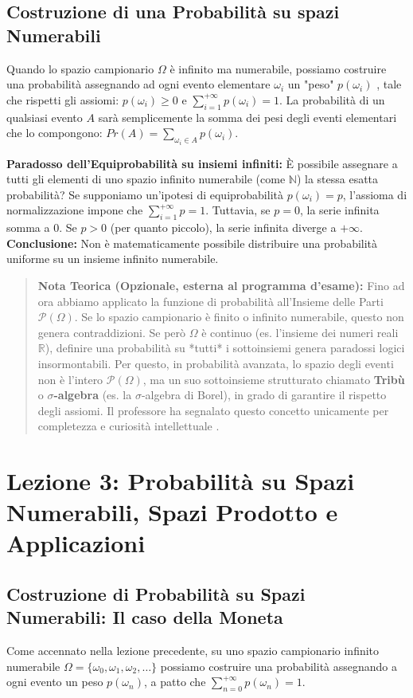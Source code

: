 \documentclass[12pt, a4paper]{article}
\begin{document}
\subsection{Costruzione di una Probabilità su spazi Numerabili}
Quando lo spazio campionario $\Omega$ è infinito ma numerabile, possiamo costruire una probabilità assegnando ad ogni evento elementare $\omega_i$ un "peso" $p(\omega_i)$ , tale che rispetti gli assiomi: $p(\omega_i) \ge 0$ e $\sum_{i=1}^{+\infty} p(\omega_i) = 1$.
La probabilità di un qualsiasi evento $A$ sarà semplicemente la somma dei pesi degli eventi elementari che lo compongono: $Pr(A) = \sum_{\omega_i \in A} p(\omega_i)$.

\textbf{Paradosso dell'Equiprobabilità su insiemi infiniti:} È possibile assegnare a tutti gli elementi di uno spazio infinito numerabile (come $\mathbb{N}$) la stessa esatta probabilità?
Se supponiamo un'ipotesi di equiprobabilità $p(\omega_i) = p$, l'assioma di normalizzazione impone che $\sum_{i=1}^{+\infty} p = 1$.
Tuttavia, se $p = 0$, la serie infinita somma a 0. Se $p > 0$ (per quanto piccolo), la serie infinita diverge a $+\infty$.
\textbf{Conclusione:} Non è matematicamente possibile distribuire una probabilità uniforme su un insieme infinito numerabile.

\vspace{0.5cm}
\begin{quote}
\textbf{Nota Teorica (Opzionale, esterna al programma d'esame):} 
Fino ad ora abbiamo applicato la funzione di probabilità all'Insieme delle Parti $\mathcal{P}(\Omega)$. Se lo spazio campionario è finito o infinito numerabile, questo non genera contraddizioni. Se però $\Omega$ è continuo (es. l'insieme dei numeri reali $\mathbb{R}$), definire una probabilità su *tutti* i sottoinsiemi genera paradossi logici insormontabili. Per questo, in probabilità avanzata, lo spazio degli eventi non è l'intero $\mathcal{P}(\Omega)$, ma un suo sottoinsieme strutturato chiamato \textbf{Tribù} o \textbf{$\sigma$-algebra} (es. la $\sigma$-algebra di Borel), in grado di garantire il rispetto degli assiomi. Il professore ha segnalato questo concetto unicamente per completezza e curiosità intellettuale .
\end{quote}


\section{Lezione 3: Probabilità su Spazi Numerabili, Spazi Prodotto e Applicazioni}

\subsection{Costruzione di Probabilità su Spazi Numerabili: Il caso della Moneta}
Come accennato nella lezione precedente, su uno spazio campionario infinito numerabile $\Omega = \{\omega_0, \omega_1, \omega_2, \dots\}$ possiamo costruire una probabilità assegnando a ogni evento un peso $p(\omega_n)$, a patto che $\sum_{n=0}^{+\infty} p(\omega_n) = 1$.
\end{document}

